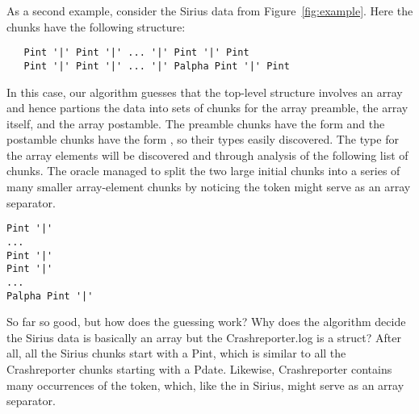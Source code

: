 
As a second example, consider the Sirius data from Figure~\ref{fig:example}.
Here the chunks have the following structure:
{\small
\begin{verbatim}
   Pint '|' Pint '|' ... '|' Pint '|' Pint
   Pint '|' Pint '|' ... '|' Palpha Pint '|' Pint
\end{verbatim}
}
\noindent
In this case, our algorithm guesses that the top-level structure involves
an array and hence partions the data into sets of chunks for the
array preamble, the array itself, and the array postamble.  The
preamble chunks have the form  and the
postamble chunks have the form , so their types easily discovered.  
The type for the array elements will be discovered and through analysis of the
following list of chunks.  The oracle managed to split the two
large initial chunks into a series of many smaller array-element chunks
by noticing the  token might serve as an array separator.
{\small
\begin{verbatim}
Pint '|' 
... 
Pint '|' 
Pint '|'
...
Palpha Pint '|'
\end{verbatim}
}
So far so good, but how does the guessing work?  Why does the
algorithm decide the Sirius data is basically an array but the
Crashreporter.log is a struct? After all, all the Sirius chunks start
with a Pint, which is similar to all the Crashreporter chunks starting
with a Pdate.  Likewise, Crashreporter contains many occurrences of
the  token, which, like the  in Sirius, might serve as
an array separator.

